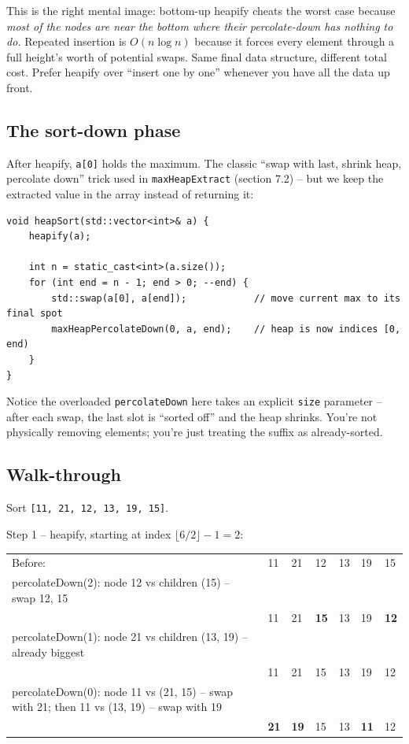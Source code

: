 \documentclass[11pt]{article}
\begin{document}
\begin{ideabox}
This is the right mental image: bottom-up heapify cheats the worst case because \emph{most of the nodes are near the bottom where their percolate-down has nothing to do.} Repeated insertion is $O(n \log n)$ because it forces every element through a full height's worth of potential swaps. Same final data structure, different total cost. Prefer heapify over ``insert one by one'' whenever you have all the data up front.
\end{ideabox}

\subsection*{The sort-down phase}

After heapify, \texttt{a[0]} holds the maximum. The classic ``swap with last, shrink heap, percolate down'' trick used in \texttt{maxHeapExtract} (section 7.2) -- but we keep the extracted value in the array instead of returning it:

\begin{lstlisting}
void heapSort(std::vector<int>& a) {
    heapify(a);

    int n = static_cast<int>(a.size());
    for (int end = n - 1; end > 0; --end) {
        std::swap(a[0], a[end]);            // move current max to its final spot
        maxHeapPercolateDown(0, a, end);    // heap is now indices [0, end)
    }
}
\end{lstlisting}

Notice the overloaded \texttt{percolateDown} here takes an explicit \texttt{size} parameter -- after each swap, the last slot is ``sorted off'' and the heap shrinks. You're not physically removing elements; you're just treating the suffix as already-sorted.

\subsection*{Walk-through}

Sort \texttt{[11, 21, 12, 13, 19, 15]}.

Step 1 -- heapify, starting at index $\lfloor 6/2 \rfloor - 1 = 2$:

\begin{center}
\begin{tabular}{lllllll}
Before: & 11 & 21 & 12 & 13 & 19 & 15 \\
percolateDown(2): node 12 vs children (15) -- swap 12, 15 \\
 & 11 & 21 & \textbf{15} & 13 & 19 & \textbf{12} \\
percolateDown(1): node 21 vs children (13, 19) -- already biggest \\
 & 11 & 21 & 15 & 13 & 19 & 12 \\
percolateDown(0): node 11 vs (21, 15) -- swap with 21; then 11 vs (13, 19) -- swap with 19 \\
 & \textbf{21} & \textbf{19} & 15 & 13 & \textbf{11} & 12 \\
\end{tabular}
\end{center}
\end{document}
